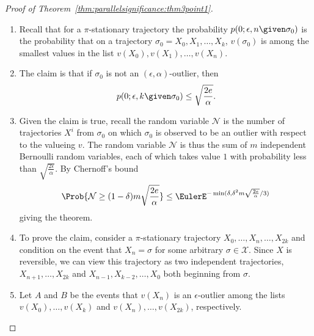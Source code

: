 \documentclass[12pt]{article}
\begin{document}
\begin{proof}[Proof of Theorem~\ref{thm:parallelsignificance:thm3point1}]
    \begin{enumerate}
        \item
            Recall that for a \( \pi \)-stationary trajectory the
            probability \( p(0; \epsilon, n \given \sigma_0) \) is the
            probability that on a trajectory \( \sigma_0 = X_0, X_1,
            \dots, X_k \), \( v(\sigma_0) \) is among the smallest
            values in the list \( v(X_0), v(X_1), \dots, v(X_n) \).
        \item
            The claim is that if \( \sigma_0 \) is not an \( (\epsilon,
            \alpha) \)-outlier, then
            \begin{equation}
                \label{eq:parallelsignificance:nine} p(0; \epsilon, k \given
                \sigma_0) \le \sqrt{\frac{2e}{\alpha}}.
            \end{equation}
        \item
            Given the claim is true, recall the random variable \(
            \mathcal{N} \) is the number of trajectories \( X^i \) from \(
            \sigma_0 \) on which \( \sigma_0 \) is observed to be an
            outlier with respect to the valueing \( v \).  The random
            variable \( \mathcal{N} \) is thus the sum of \( m \)
            independent Bernoulli random variables, each of which takes
            value \( 1 \) with probability less than \( \sqrt{\frac{2
            \epsilon}{\alpha}} \).  By Chernoff's bound
            \[
                \Prob{\mathcal{N} \ge (1 - \delta) m \sqrt{\frac{2e}{\alpha}}
                } \le \EulerE^{ -\min (\delta, \delta^2 m \sqrt{\frac{2e}
                {\alpha}}/3)}
            \] giving the theorem.
        \item
            To prove the claim, consider a \( \pi \)-stationary
            trajectory \( X_0, \dots, X_n, \dots, X_{2k} \) and
            condition on the event that \( X_n = \sigma \) for some
            arbitrary \( \sigma \in \mathcal{X} \).  Since \( X \) is
            reversible, we can view this trajectory as two independent
            trajectories, \( X_{n+1}, \dots, X_{2k} \) and \( X_{n-1}, X_
            {k-2}, \dots, X_0 \) both beginning from \( \sigma \).
        \item
            Let \( A \) and \( B \) be the events that \( v(X_n) \) is
            an \( \epsilon \)-outlier among the lists \( v(X_0), \dots,
            v(X_k) \) and \( v(X_n), \dots, v(X_{2k}) \), respectively.

\end{enumerate}
\end{proof}
\end{document}
